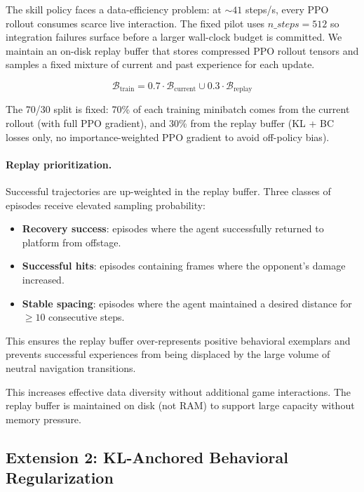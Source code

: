 \documentclass[11pt,a4paper]{article}
\begin{document}
The skill policy faces a data-efficiency problem: at ${\sim}41$ steps/s, every PPO rollout consumes scarce live interaction. The fixed pilot uses $n\_steps=512$ so integration failures surface before a larger wall-clock budget is committed.
We maintain an on-disk replay buffer that stores compressed PPO rollout tensors and samples a fixed mixture of current and past experience for each update.

\begin{equation}
\mathcal{B}_{\text{train}} = 0.7 \cdot \mathcal{B}_{\text{current}} \cup 0.3 \cdot \mathcal{B}_{\text{replay}}
\label{eq:replay-mix}
\end{equation}

The 70/30 split is fixed: 70\% of each training minibatch comes from the current rollout (with full PPO gradient), and 30\% from the replay buffer (KL + BC losses only, no importance-weighted PPO gradient to avoid off-policy bias).

\paragraph{Replay prioritization.}
Successful trajectories are up-weighted in the replay buffer.
Three classes of episodes receive elevated sampling probability:
\begin{itemize}[leftmargin=1.5em, noitemsep]
    \item \textbf{Recovery success}: episodes where the agent successfully returned to platform from offstage.
    \item \textbf{Successful hits}: episodes containing frames where the opponent's damage increased.
    \item \textbf{Stable spacing}: episodes where the agent maintained a desired distance for $\geq 10$ consecutive steps.
\end{itemize}
This ensures the replay buffer over-represents positive behavioral exemplars and prevents successful experiences from being displaced by the large volume of neutral navigation transitions.

This increases effective data diversity without additional game interactions.
The replay buffer is maintained on disk (not RAM) to support large capacity without memory pressure.

\subsection{Extension 2: KL-Anchored Behavioral Regularization}
\end{document}
